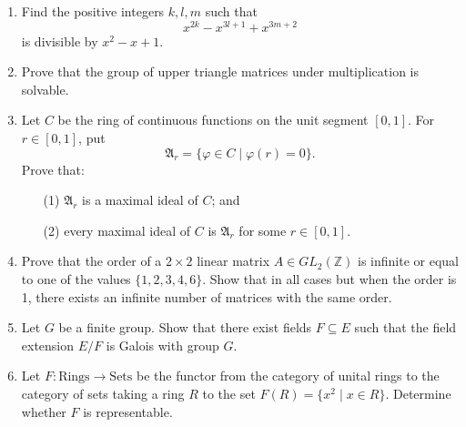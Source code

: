 \documentclass{article}
\begin{document}
\begin{enumerate}
    \item Find the positive integers \(k, l, m\) such that 
    \[x^{2k} - x^{3l+1} + x^{3m+2}\] 
    is divisible by \(x^2 - x + 1\).

    \item Prove that the group of upper triangle matrices under multiplication is solvable.

    \item Let \(C\) be the ring of continuous functions on the unit segment \([0,1]\). For \(r \in [0,1]\), put 
    \[\mathfrak{A}_r = \{\varphi \in C \mid \varphi(r) = 0\}.\]
    Prove that:
    \begin{itemize}
        \item[(1)] \(\mathfrak{A}_r\) is a maximal ideal of \(C\); and
        \item[(2)] every maximal ideal of \(C\) is \(\mathfrak{A}_r\) for some \(r \in [0,1]\).
    \end{itemize}

    \item Prove that the order of a \(2 \times 2\) linear matrix \(A \in GL_2(\mathbb{Z})\) is infinite or equal to one of the values \(\{1, 2, 3, 4, 6\}\). Show that in all cases but when the order is 1, there exists an infinite number of matrices with the same order.

    \item Let \(G\) be a finite group. Show that there exist fields \(F \subseteq E\) such that the field extension \(E/F\) is Galois with group \(G\).

    \item Let \(F: \text{Rings} \rightarrow \text{Sets}\) be the functor from the category of unital rings to the category of sets taking a ring \(R\) to the set \(F(R) = \{x^2 \mid x \in R\}\). Determine whether \(F\) is representable.
\end{enumerate}
\end{document}
